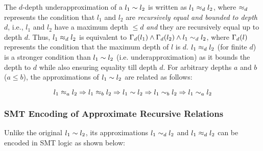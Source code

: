 The $d$-depth underapproximation of a \recursiveRelation{} $l_1 \sim{} l_2$
is written as $l_1 \approx_d l_2$, where $\approx_d$ represents
the condition that $l_1$ and $l_2$ are {\em recursively equal and bounded to depth $d$},
i.e., $l_1$ and $l_2$ have a maximum depth $\leq d$ {\em and}
they are recursively equal up to depth $d$.
Thus, $l_1 \approx_d l_2$ is equivalent to
$\Gamma_d(l_1) \land \Gamma_d(l_2) \land l_1 \sim_d l_2$,
where $\Gamma_d(l)$ represents the condition that the maximum
depth of $l$ is $d$.
$l_1 \approx_d l_2$ (for finite $d$) is a stronger condition than
$l_1\sim{}l_2$ (i.e. underapproximation)
as it bounds the depth to $d$ while also ensuring equality till depth $d$.
For arbitrary depths $a$ and $b$ ($a \leq b$),
the approximations of $l_1 \sim{} l_2$ are related as follows:

\begin{equation}
\label{eqn:approxrels}
l_1 \approx_a l_2 \Rightarrow l_1 \approx_b l_2 \Rightarrow l_1 \sim{} l_2 \Rightarrow l_1 \sim_b l_2 \Rightarrow l_1 \sim_a l_2
\end{equation}

\subsubsection{SMT Encoding of Approximate Recursive Relations}
Unlike the original \recursiveRelation{} $l_1 \sim{} l_2$,
its approximations $l_1\sim_dl_2$ and $l_1\approx_dl_2$ can be encoded in SMT logic as shown below:

